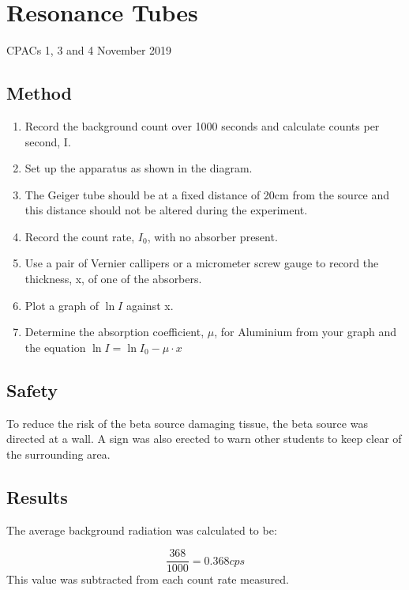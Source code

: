 \section{Resonance Tubes}
CPACs 1, 3 and 4
\hfill
{} November 2019

\subsection{Method}
\begin{enumerate}
  \item Record the background count over 1000 seconds and calculate counts per second, I.
  \item Set up the apparatus as shown in the diagram.
  \item The Geiger tube should be at a fixed distance of 20cm from the source and this distance should not be altered during the experiment.
  \item Record the count rate, $I_0$, with no absorber present.
  \item Use a pair of Vernier callipers or a micrometer screw gauge to record the thickness, x, of one of the absorbers.
  \item Plot a graph of $\ln{I}$ against x.
  \item Determine the absorption coefficient, $\mu$, for Aluminium from your graph and the equation $\ln{I}=\ln{I_0} - \mu \cdot x$
\end{enumerate}

\subsection{Safety}
To reduce the risk of the beta source damaging tissue, the beta source was directed at a wall. A sign was also erected to warn other students to keep clear of the surrounding area.

\subsection{Results}

The average background radiation was calculated to be:

\begin{equation}
  \frac{368}{1000} = 0.368 cps
\end{equation}
This value was subtracted from each count rate measured.

\begin{center}
\end{center}

